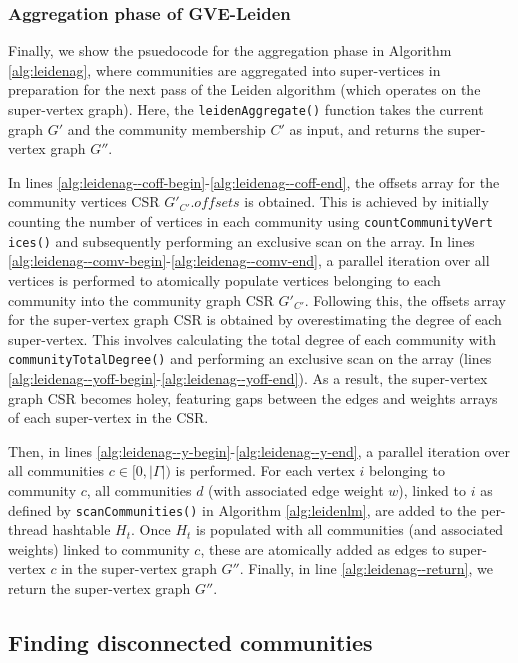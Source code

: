 


\subsubsection{Aggregation phase of GVE-Leiden}

Finally, we show the psuedocode for the aggregation phase in Algorithm \ref{alg:leidenag}, where communities are aggregated into super-vertices in preparation for the next pass of the Leiden algorithm (which operates on the super-vertex graph). Here, the \texttt{leidenAggregate()} function takes the current graph $G'$ and the community membership $C'$ as input, and returns the super-vertex graph $G''$.

In lines \ref{alg:leidenag--coff-begin}-\ref{alg:leidenag--coff-end}, the offsets array for the community vertices CSR $G'_{C'}.offsets$ is obtained. This is achieved by initially counting the number of vertices in each community using \texttt{countCommunityVert} \texttt{ices()} and subsequently performing an exclusive scan on the array. In lines \ref{alg:leidenag--comv-begin}-\ref{alg:leidenag--comv-end},  a parallel iteration over all vertices is performed to atomically populate vertices belonging to each community into the community graph CSR $G'_{C'}$. Following this, the offsets array for the super-vertex graph CSR is obtained by overestimating the degree of each super-vertex. This involves calculating the total degree of each community with \texttt{communityTotalDegree()} and performing an exclusive scan on the array (lines \ref{alg:leidenag--yoff-begin}-\ref{alg:leidenag--yoff-end}). As a result, the super-vertex graph CSR becomes holey, featuring gaps between the edges and weights arrays of each super-vertex in the CSR.

Then, in lines \ref{alg:leidenag--y-begin}-\ref{alg:leidenag--y-end}, a parallel iteration over all communities $c \in [0, |\Gamma|)$ is performed. For each vertex $i$ belonging to community $c$, all communities $d$ (with associated edge weight $w$), linked to $i$ as defined by \texttt{scanCommunities()} in Algorithm \ref{alg:leidenlm}, are added to the per-thread hashtable $H_t$. Once $H_t$ is populated with all communities (and associated weights) linked to community $c$, these are atomically added as edges to super-vertex $c$ in the super-vertex graph $G''$. Finally, in line \ref{alg:leidenag--return}, we return the super-vertex graph $G''$.




\subsection{Finding disconnected communities}

